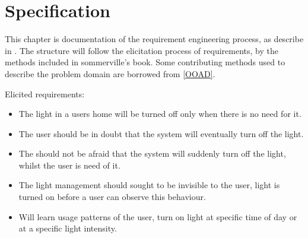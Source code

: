 \chapter{Specification}

This chapter is documentation of the requirement engineering process, as describe in \cite{sommerville}. The structure will follow the elicitation process of requirements, by the methods included in sommerville's book. Some contributing methods used to describe the problem domain are borrowed from \cref{OOAD}. 












Elicited requirements:

\begin{itemize}
\item The light in a users home will be turned off only when there is no need for it.
\item The user should be in doubt that the system will eventually turn off the light.
\item The should not be afraid that the system will suddenly turn off the light, whilst the user is need of it.
\item The light management should sought to be invisible to the user, light is turned on before a user can observe this behaviour.
\item Will learn usage patterns of the user, turn on light at specific time of day or at a specific light intensity.
\end{itemize}
